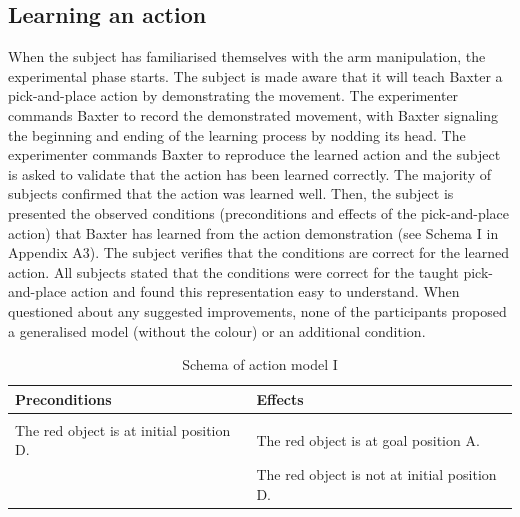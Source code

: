 \subsection{Learning an action}
When the subject has familiarised themselves with the arm manipulation, the experimental phase starts. The subject is made aware that it will teach Baxter a pick-and-place action by demonstrating the movement. The experimenter commands Baxter to record the demonstrated movement, with Baxter signaling the beginning and ending of the learning process by nodding its head. The experimenter commands Baxter to reproduce the learned action and the subject is asked to validate that the action has been learned correctly. The majority of subjects confirmed that the action was learned well. Then, the subject is presented the observed conditions (preconditions and effects of the pick-and-place action) that Baxter has learned from the action demonstration (see Schema I in Appendix A3).
The subject verifies that the conditions are correct for the learned action. All subjects stated that the conditions were correct for the taught pick-and-place action and found this representation easy to understand. When questioned about any suggested improvements, none of the participants proposed a generalised model (without the colour) or an additional condition.

\begin{table}[h]
	\begin{center}
		\begin{tabular}{l|l}
			Preconditions & Effects\\ \hline
			& \\
			The red object is at initial position D. & The red object is at goal position A.\\
			& The red object is not at initial position D.
		\end{tabular}
	\end{center}
	\label{tab:schema1}
	\caption{Schema of action model I}
\end{table}

